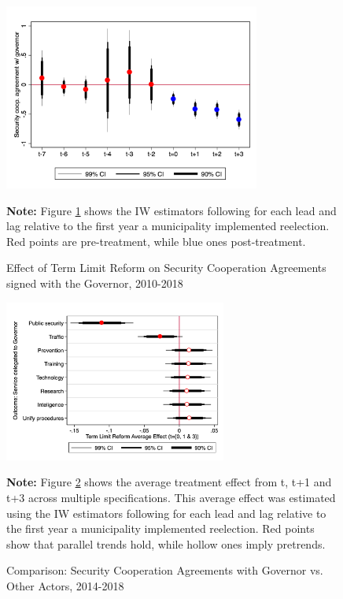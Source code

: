 \documentclass[12pt]{amsart}
\numberwithin{equation}{section}
\theoremstyle{definition}
\theoremstyle{definition}
\theoremstyle{definition}
\begin{document}
\begin{figure}[h] 
\centering
 \caption{Effect of Term Limit Reform on Security Cooperation Agreements signed with the Governor, 2010-2018}
 \label{fig:event_study_agreements}
\includegraphics[width=0.75\textwidth]{Figures/catts_agreements.png}
       \captionsetup{justification=centering}
       
 \textbf{Note:} Figure \ref{fig:event_study_agreements} shows the IW estimators following \citet{abraham_sun_2020} for each lead and lag relative to the first year a municipality implemented reelection. Red points are pre-treatment, while blue ones post-treatment. 
     
\end{figure}   

 \begin{figure}[h]   
\centering
 \caption{Comparison: Security Cooperation Agreements with Governor vs. Other Actors, 2014-2018}
 \label{fig:services}
\includegraphics[width=0.65\textwidth]{Figures/services.png}
       \captionsetup{justification=centering}
       
 \textbf{Note:} Figure \ref{fig:services} shows the average treatment effect from t, t+1 and t+3 across multiple specifications. This average effect was estimated using the IW estimators following \citet{abraham_sun_2020} for each lead and lag relative to the first year a municipality implemented reelection. Red points show that parallel trends hold, while hollow ones imply pretrends. 
\end{figure}  
\end{document}
